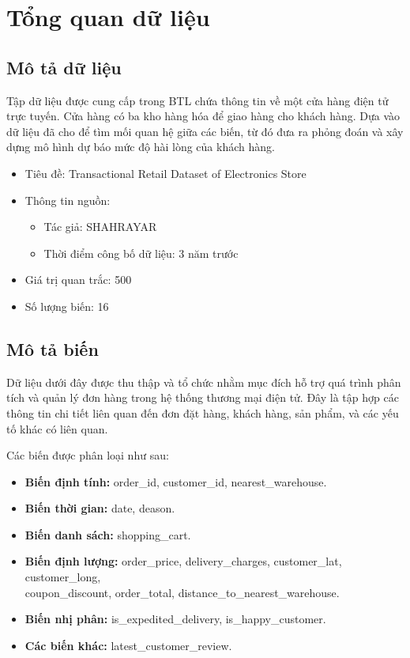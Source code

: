 \section{Tổng quan dữ liệu}
\subsection{Mô tả dữ liệu}
Tập dữ liệu được cung cấp trong BTL chứa thông tin về một cửa hàng điện tử trực tuyến. Cửa hàng có ba kho hàng hóa để giao hàng cho khách hàng. Dựa vào dữ liệu đã cho để tìm mối quan hệ giữa các biến, từ đó đưa ra phỏng đoán và xây dựng mô hình dự báo mức độ hài lòng của khách hàng.

\begin{itemize}
    \item Tiêu đề: Transactional Retail Dataset of Electronics Store
    \item Thông tin nguồn:
        \begin{itemize}
            \item Tác giả: SHAHRAYAR
            \item Thời điểm công bố dữ liệu: 3 năm trước
        \end{itemize}
    \item Giá trị quan trắc: 500
    \item Số lượng biến: 16
\end{itemize}

\subsection{Mô tả biến}
Dữ liệu dưới đây được thu thập và tổ chức nhằm mục đích hỗ trợ quá trình phân tích và quản lý đơn hàng trong hệ thống thương mại điện tử. Đây là tập hợp các thông tin chi tiết liên quan đến đơn đặt hàng, khách hàng, sản phẩm, và các yếu tố khác có liên quan.

Các biến được phân loại như sau:
\begin{itemize}
    \item \textbf{Biến định tính:} order\_id, customer\_id, nearest\_warehouse.
    \item \textbf{Biến thời gian:} date, deason.
    \item \textbf{Biến danh sách:} shopping\_cart.
    \item \textbf{Biến định lượng:} order\_price, delivery\_charges, customer\_lat, customer\_long,\\coupon\_discount, order\_total, distance\_to\_nearest\_warehouse.
    \item \textbf{Biến nhị phân:} is\_expedited\_delivery, is\_happy\_customer.
    \item \textbf{Các biến khác:} latest\_customer\_review.
\end{itemize}

